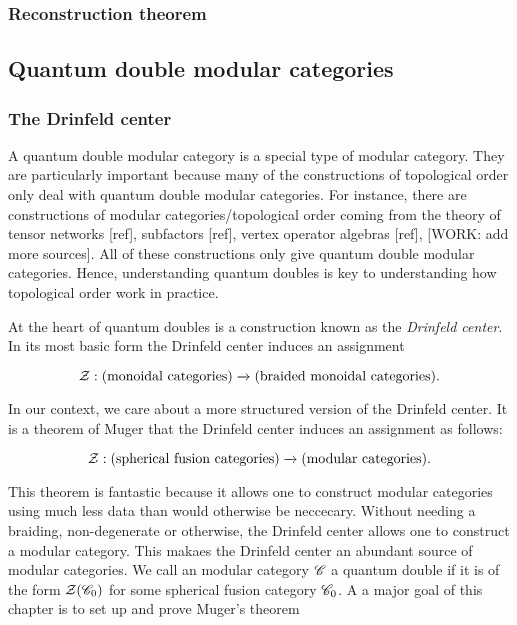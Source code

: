 \subsubsection{Reconstruction theorem}



\subsection{Quantum double modular categories}

\subsubsection{The Drinfeld center}

A quantum double modular category is a special type of modular category. They are particularly important because many of the constructions of topological order only deal with quantum double modular categories. For instance, there are constructions of modular categories/topological order coming from the theory of tensor networks [ref], subfactors [ref], vertex operator algebras [ref], [WORK: add more sources]. All of these constructions only give quantum double modular categories. Hence, understanding quantum doubles is key to understanding how topological order work in practice.

At the heart of quantum doubles is a construction known as the \textit{Drinfeld center}. In its most basic form the Drinfeld center induces an assignment

$$\mathcal{Z}: (\text{monoidal categories})\xrightarrow{}(\text{braided monoidal categories}).$$

In our context, we care about a more structured version of the Drinfeld center. It is a theorem of Muger that the Drinfeld center induces an assignment as follows:

$$\mathcal{Z}: (\text{spherical fusion categories})\xrightarrow{}(\text{modular categories}).$$

This theorem is fantastic because it allows one to construct modular categories using much less data than would otherwise be neccecary. Without needing a braiding, non-degenerate or otherwise, the Drinfeld center allows one to construct a modular category. This makaes the Drinfeld center an abundant source of modular categories. We call an modular category $\mathscr{C}$ a quantum double if it is of the form $\mathcal{Z}(\mathscr{C}_0)$ for some spherical fusion category $\mathscr{C}_0$. A a major goal of this chapter is to set up and prove Muger's theorem

